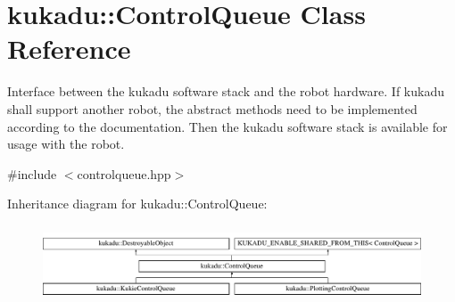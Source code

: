 \hypertarget{classkukadu_1_1ControlQueue}{\section{kukadu\-:\-:Control\-Queue Class Reference}
\label{classkukadu_1_1ControlQueue}
}


Interface between the kukadu software stack and the robot hardware. If kukadu shall support another robot, the abstract methods need to be implemented according to the documentation. Then the kukadu software stack is available for usage with the robot.  




{\ttfamily \#include $<$controlqueue.\-hpp$>$}

Inheritance diagram for kukadu\-:\-:Control\-Queue\-:\begin{figure}[H]
\begin{center}
\leavevmode
\includegraphics[height=2.301370cm]{classkukadu_1_1ControlQueue}
\end{center}
\end{figure}
